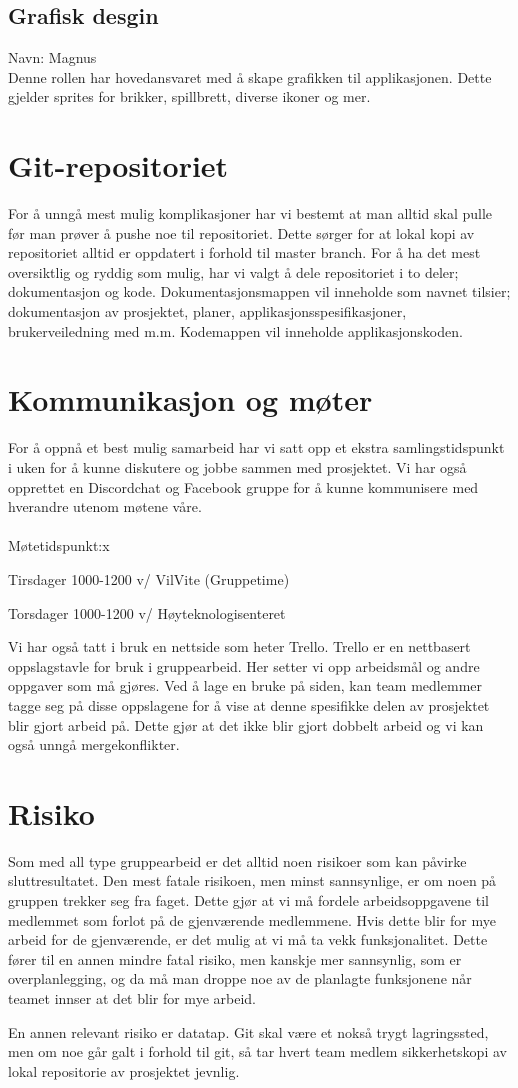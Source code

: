 \documentclass{article}
\begin{document}
\subsection*{Grafisk desgin}
Navn: Magnus\\
Denne rollen har hovedansvaret med å skape grafikken til applikasjonen. Dette gjelder sprites for brikker, spillbrett, diverse ikoner og mer.

\section*{Git-repositoriet}
For å unngå mest mulig komplikasjoner har vi bestemt at man alltid skal pulle før man prøver å pushe noe til repositoriet. Dette sørger for at lokal kopi av repositoriet alltid er oppdatert i forhold til master branch. For å ha det mest oversiktlig og ryddig som mulig, har vi valgt å dele repositoriet i to deler; dokumentasjon og kode. Dokumentasjonsmappen vil inneholde som navnet tilsier; dokumentasjon av prosjektet, planer, applikasjonsspesifikasjoner, brukerveiledning med m.m. Kodemappen vil inneholde applikasjonskoden.

\section*{Kommunikasjon og møter}
For å oppnå et best mulig samarbeid har vi satt opp et ekstra samlingstidspunkt i uken for å kunne diskutere og jobbe sammen med prosjektet. Vi har også opprettet en Discordchat og Facebook gruppe for å kunne kommunisere med hverandre utenom møtene våre.\\\\
Møtetidspunkt:x
			\begin{list}{-}{}
				\item Tirsdager 1000-1200 v/ VilVite (Gruppetime) 
				\item Torsdager 1000-1200 v/ Høyteknologisenteret
			\end{list}

Vi har også tatt i bruk en nettside som heter Trello. Trello er en nettbasert oppslagstavle for bruk i gruppearbeid. Her setter vi opp arbeidsmål og andre oppgaver som må gjøres. Ved å lage en bruke på siden, kan team medlemmer tagge seg på disse oppslagene for å vise at denne spesifikke delen av prosjektet blir gjort arbeid på. Dette gjør at det ikke blir gjort dobbelt arbeid og vi kan også unngå mergekonflikter.

\section*{Risiko}
Som med all type gruppearbeid er det alltid noen risikoer som kan påvirke sluttresultatet. Den mest fatale risikoen, men minst sannsynlige, er om noen på gruppen trekker seg fra faget. Dette gjør at vi må fordele arbeidsoppgavene til medlemmet som forlot på de gjenværende medlemmene. Hvis dette blir for mye arbeid for de gjenværende, er det mulig at vi må ta vekk funksjonalitet. Dette fører til en annen mindre fatal risiko, men kanskje mer sannsynlig, som er overplanlegging, og da må man droppe noe av de planlagte funksjonene når teamet innser at det blir for mye arbeid.

En annen relevant risiko er datatap. Git skal være et nokså trygt lagringssted, men om noe går galt i forhold til git, så tar hvert team medlem sikkerhetskopi av lokal repositorie av prosjektet jevnlig.
\end{document}

